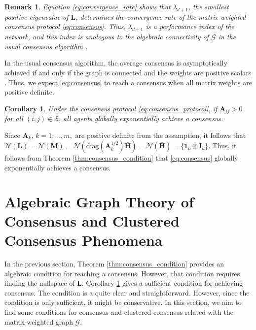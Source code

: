 \documentclass[draftclsnofoot,11pt,onecolumn]{IEEEtran}
\newtheorem{Remark}{Remark}
\newtheorem{Corollary}{Corollary}
\newcommand{\m}[1]{\mathbf{#1}}
\newcommand{\mc}[1]{\mathcal{#1}}
\begin{document}
\begin{Remark}\label{remark:convergence_rate}
Equation \eqref{eq:convergence_rate} shows that $\lambda_{d+1}$, the smallest positive eigenvalue of $\m{L}$, determines the convergence rate of the matrix-weighted consensus protocol \eqref{eq:consensus}. Thus, $\lambda_{d+1}$ is a performance index of the network, and this index is analogous to the algebraic connectivity of $\mc{G}$ in the usual consensus algorithm \cite{Olfati2007,MesbahiEgerstedt}.
\end{Remark}

In the usual consensus algorithm, the average consensus is asymptotically achieved if and only if the graph is connected and the weights are positive scalars \cite{Olfati2004,Olfati2007}. Thus, we expect \eqref{eq:consensus} to reach a consensus when all matrix weights are positive definite.
\begin{Corollary} \label{cor:of_thm_2} Under the consensus protocol \eqref{eq:consensus_protocol}, if $\m{A}_{ij} > 0$ for all $(i,j) \in \mc{E}$, all agents globally exponentially achieve a consensus.
\end{Corollary}

\begin{IEEEproof}  
Since $\m{A}_{k}$, $k = 1, \ldots, m,$ are positive definite from the assumption, it follows that $\mc{N}(\m{L}) = \mc{N}(\m{M}) = \mc{N}(\text{diag}(\m{A}_{k}^{1/2})\bar{\m{H}})= \mc{N}(\bar{\m{H}}) = \{ \m{1}_n \otimes \m{I}_{d} \}$. Thus, it follows from Theorem \ref{thm:consensus_condition} that \eqref{eq:consensus} globally exponentially achieves a consensus. 
\end{IEEEproof}

\section{Algebraic Graph Theory of Consensus and Clustered Consensus Phenomena}
\label{sec:4}
In the previous section, Theorem \ref{thm:consensus_condition} provides an algebraic condition for reaching a consensus. However, that condition requires finding the nullspace of $\m{L}$. Corollary \ref{cor:of_thm_2} gives a sufficient condition for achieving consensus. The condition is a quite clear and straightforward. However, since the condition is only sufficient, it might be conservative. In this section, we aim to find some conditions for consensus and clustered consensus related with the  matrix-weighted graph $\mc{G}$.
\end{document}
